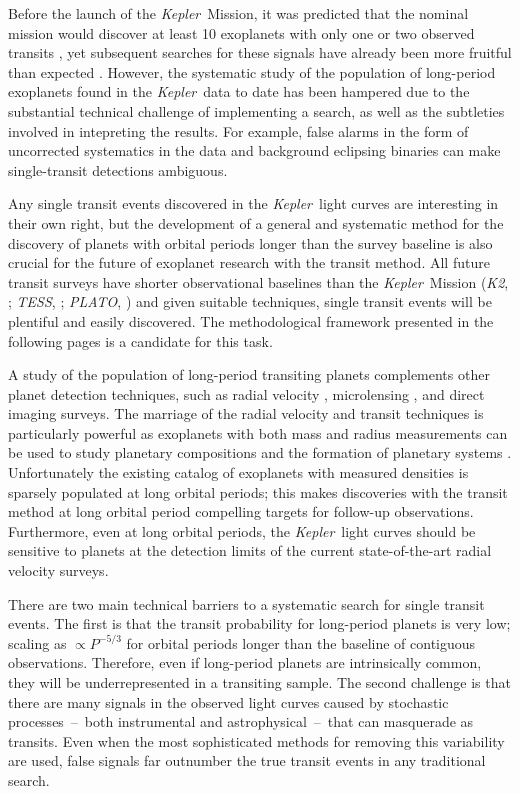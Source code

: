 \documentclass[manuscript, letterpaper]{aastex6}
\newcommand{\project}[1]{\textsl{#1}}
\newcommand{\kepler}{\project{Kepler}}
\newcommand{\KT}{\project{K2}}
\newcommand{\tess}{\project{TESS}}
\newcommand{\plato}{\project{PLATO}}
\begin{document}
Before the launch of the \kepler\ Mission, it was predicted that the nominal
mission would discover at least 10 exoplanets with only one or two observed
transits \citep{Yee:2008}, yet subsequent searches for these signals have
already been more fruitful than expected \citep{Wang:2015, Uehara:2016}.
However, the systematic study of the population of long-period exoplanets
found in the \kepler\ data to date has been hampered due to the
substantial technical challenge of implementing a search, as well as the
subtleties involved in intepreting the results. For example,
false alarms in the form of uncorrected systematics in the data and background
eclipsing binaries can make single-transit detections ambiguous.

Any single transit events discovered in the \kepler\ light curves are
interesting in their own right, but the development of a general and
systematic method for the discovery of planets with orbital periods longer
than the survey baseline is also crucial for the future of exoplanet research
with the transit method.
All future transit surveys have shorter observational baselines than the
\kepler\ Mission (\KT, \citealt{Howell:2014}; \tess, \citealt{Ricker:2015};
\plato, \citealt{Rauer:2014}) and given suitable techniques, single transit
events will be plentiful and easily discovered.
The methodological framework presented in the following pages is a candidate
for this task.

A study of the population of long-period transiting planets complements other
planet detection techniques, such as radial velocity \citep[for
example][]{Cumming:2008, Knutson:2014, Bryan:2016}, microlensing \citep[for
example][]{Gould:2010, Cassan:2012, Clanton:2014, Shvartzvald:2016}, and
direct imaging \citep[for example][]{Bowler:2016} surveys.
The marriage of the radial velocity and transit techniques is particularly
powerful as exoplanets with both mass and radius measurements can be used to
study planetary compositions and the formation of planetary systems \citep[for
example][]{Weiss:2014, Rogers:2015, Wolfgang:2016}.
Unfortunately the existing catalog of exoplanets with measured densities is sparsely
populated at long orbital periods;  this makes discoveries with the transit method
at long orbital period compelling targets for follow-up observations.
Furthermore, even at long orbital periods, the \kepler\ light curves should be
sensitive to planets at the detection limits of the current state-of-the-art
radial velocity surveys.

There are two main technical barriers to a systematic search for single
transit events.
The first is that the transit probability for long-period planets is very low;
scaling as $\propto P^{-5/3}$ for orbital periods longer than the
baseline of contiguous observations.
Therefore, even if long-period planets are intrinsically common, they will
be underrepresented in a transiting sample.
The second challenge is that there are many signals in the observed light
curves caused by stochastic processes~--~both instrumental and
astrophysical~--~that can masquerade as transits.
Even when the most sophisticated methods for removing this variability are
used, false signals far outnumber the true transit events in any traditional
search.
\end{document}

